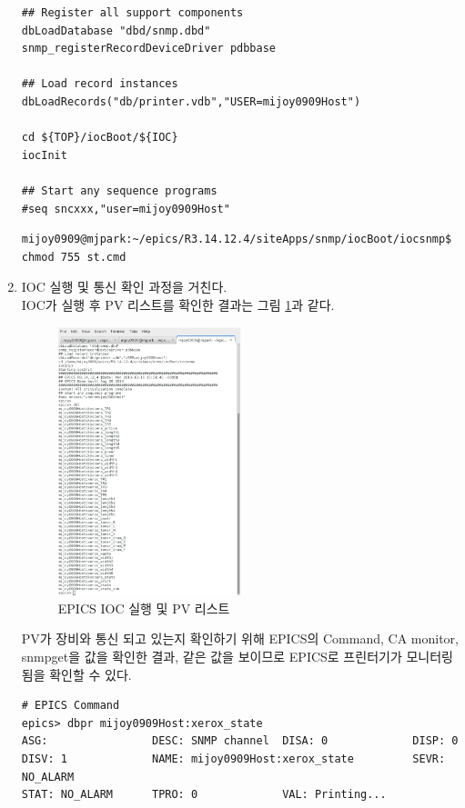 \documentclass[11pt
  , a4paper
  , article
  , oneside
]{memoir}
\begin{document}
\begin{enumerate}
\begin{lstlisting}[style=termstylenumber]
## Register all support components
dbLoadDatabase "dbd/snmp.dbd"
snmp_registerRecordDeviceDriver pdbbase

## Load record instances
dbLoadRecords("db/printer.vdb","USER=mijoy0909Host")

cd ${TOP}/iocBoot/${IOC}
iocInit

## Start any sequence programs
#seq sncxxx,"user=mijoy0909Host"
\end{lstlisting}

\begin{lstlisting}[style=termstyle]
mijoy0909@mjpark:~/epics/R3.14.12.4/siteApps/snmp/iocBoot/iocsnmp$ chmod 755 st.cmd
\end{lstlisting}

\item IOC 실행 및 통신 확인 과정을 거친다.\\
IOC가 실행 후 PV 리스트를 확인한 결과는 그림 \ref{fig: printer_ioc}과 같다. 

\begin{figure}[h!]
  \centering
  	      \includegraphics[width=0.5\textwidth]{./images/printer_ioc.eps}
  \caption{EPICS IOC 실행 및 PV 리스트}
  	      \label{fig: printer_ioc}
\end{figure}

PV가 장비와 통신 되고 있는지 확인하기 위해 EPICS의 Command, CA monitor, snmpget을 값을 확인한 결과, 같은 값을 보이므로 EPICS로 프린터기가 모니터링됨을 확인할 수 있다.  
\begin{lstlisting}[style=termstyle]
# EPICS Command
epics> dbpr mijoy0909Host:xerox_state
ASG:                DESC: SNMP channel  DISA: 0             DISP: 0             
DISV: 1             NAME: mijoy0909Host:xerox_state         SEVR: NO_ALARM      
STAT: NO_ALARM      TPRO: 0             VAL: Printing...    
\end{lstlisting}


\end{enumerate}
\end{document}
